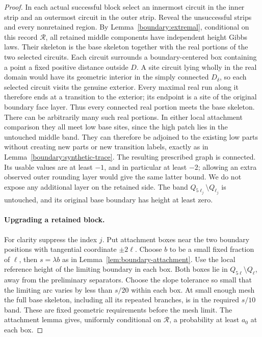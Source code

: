 \documentclass[11pt]{article}
\theoremstyle{definition}
\theoremstyle{remark}
\numberwithin{equation}{section}
\begin{document}
\begin{proof}
In each actual successful block select an innermost circuit in the
inner strip and an outermost circuit in the outer strip.  Reveal
the unsuccessful strips and every nonretained region.  By
Lemma~\ref{boundary:extremal}, conditional on this record
$\mathcal R$, all retained middle components have independent height
Gibbs laws.  Their skeleton is the base skeleton together with the
real portions of the two selected circuits.  Each circuit surrounds
a boundary-centered box containing a point a fixed positive distance
outside $D$.  A site circuit lying wholly in the real domain would
have its geometric interior in the simply connected $D_\delta$,
so each selected circuit visits the genuine exterior.  Every maximal
real run along it therefore ends at a transition to the exterior;
its endpoint is a site of the original boundary face layer.  Thus
every connected real portion meets the base skeleton.  There can be
arbitrarily many such real portions.  In either local attachment
comparison they all meet low base sites, since the high patch lies
in the untouched middle band.  They can therefore be adjoined to
the existing low parts without creating new parts or new transition
labels, exactly as in Lemma~\ref{boundary:synthetic-trace}.
The resulting prescribed graph is connected.  Its usable values are
at least $-1$, and in particular at least $-2$; allowing an extra observed
outer rounding layer would give the same latter bound.  We do not
expose any additional layer on the retained side.  The band
$Q_{5\ell_j}\setminus Q_{\ell_j}$ is untouched, and its original
base boundary has height at least zero.

\paragraph{Upgrading a retained block.}
For clarity suppress the index $j$.  Put attachment boxes near the
two boundary positions with tangential coordinate $\pm2\ell$.
Choose $b$ to be a small fixed fraction of $\ell$, then
$s=\lambda b$ as in Lemma~\ref{lem:boundary-attachment}.  Use the
local reference height of the limiting boundary in each box.
Both boxes lie in $Q_{5\ell}\setminus Q_\ell$, away from the
preliminary separators.  Choose the slope tolerance so small that
the limiting arc varies by less than $s/20$ within each box.  At
small enough mesh the full base skeleton, including all its
repeated branches, is in the required $s/10$ band.  These are fixed
geometric requirements before the mesh limit.  The attachment
lemma gives, uniformly conditional on $\mathcal R$, a probability
at least $a_0$ at each box.


\end{proof}
\end{document}
